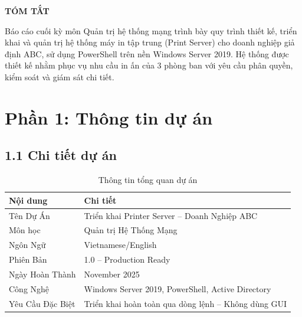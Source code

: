 
\begin{center}
    {\Large \textbf{TÓM TẮT}}
\end{center}


\vspace{0.8cm}

\setlength{\parindent}{1.2cm}
\setlength{\parskip}{6pt}

Báo cáo cuối kỳ môn Quản trị hệ thống mạng trình bày quy trình thiết kế, triển khai và quản trị hệ thống máy in tập trung (Print Server) cho doanh nghiệp giả định ABC, sử dụng PowerShell trên nền Windows Server 2019. Hệ thống được thiết kế nhằm phục vụ nhu cầu in ấn của 3 phòng ban với yêu cầu phân quyền, kiểm soát và giám sát chi tiết.


\section*{Phần 1: Thông tin dự án}

\subsection*{1.1 Chi tiết dự án}

\begin{table}[h]
\centering
\begin{tabular}{|l|p{11cm}|}
\hline
\textbf{Nội dung} & \textbf{Chi tiết} \\
\hline
Tên Dự Án & Triển khai Printer Server – Doanh Nghiệp ABC \\
\hline
Môn học & Quản trị Hệ Thống Mạng \\
\hline
Ngôn Ngữ & Vietnamese/English \\
\hline
Phiên Bản & 1.0 – Production Ready \\
\hline
Ngày Hoàn Thành & November 2025 \\
\hline
Công Nghệ & Windows Server 2019, PowerShell, Active Directory \\
\hline
Yêu Cầu Đặc Biệt & Triển khai hoàn toàn qua dòng lệnh – Không dùng GUI \\
\hline
\end{tabular}
\caption{Thông tin tổng quan dự án}
\label{tab:project_info}
\end{table}


